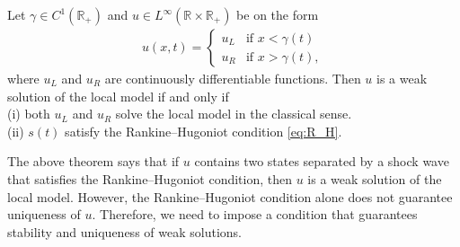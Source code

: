 \begin{theorem}
    Let $\gamma \in C^{1}(\mathbb{R}_+)$ and  $u \in L^{\infty}(\mathbb{R} \times \mathbb{R_{+}})$ be on the form
    \begin{align*}
        u(x,t) =
        \begin{cases}
            u_{L} & \text{if } x < \gamma(t)  \\
            u_{R} & \text{if } x > \gamma(t),
        \end{cases}
    \end{align*}
    where  $u_L$ and $u_R$ are continuously differentiable functions. Then $u$ is a weak solution of the local model if and only if\\
    (i) both $u_L$ and $u_R$ solve the local model in the classical sense.\\
    (ii) $s(t)$ satisfy the Rankine--Hugoniot condition \eqref{eq:R_H}.
\end{theorem}
The above theorem says that if $u$ contains two states separated by a shock wave that satisfies the Rankine--Hugoniot condition, then $u$ is a weak solution of the local model. However, the Rankine--Hugoniot condition alone does not guarantee uniqueness of $u$. Therefore, we need to impose a condition that guarantees stability and uniqueness of weak solutions.

